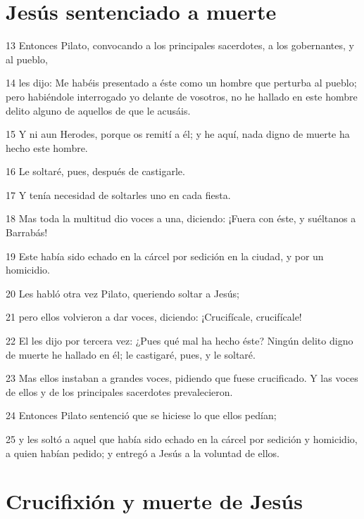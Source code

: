 \section*{Jesús sentenciado a muerte}

\par 13 Entonces Pilato, convocando a los principales sacerdotes, a los gobernantes, y al pueblo,
\par 14 les dijo: Me habéis presentado a éste como un hombre que perturba al pueblo; pero habiéndole interrogado yo delante de vosotros, no he hallado en este hombre delito alguno de aquellos de que le acusáis.
\par 15 Y ni aun Herodes, porque os remití a él; y he aquí, nada digno de muerte ha hecho este hombre.
\par 16 Le soltaré, pues, después de castigarle.
\par 17 Y tenía necesidad de soltarles uno en cada fiesta.
\par 18 Mas toda la multitud dio voces a una, diciendo: ¡Fuera con éste, y suéltanos a Barrabás!
\par 19 Este había sido echado en la cárcel por sedición en la ciudad, y por un homicidio.
\par 20 Les habló otra vez Pilato, queriendo soltar a Jesús;
\par 21 pero ellos volvieron a dar voces, diciendo: ¡Crucifícale, crucifícale!
\par 22 El les dijo por tercera vez: ¿Pues qué mal ha hecho éste? Ningún delito digno de muerte he hallado en él; le castigaré, pues, y le soltaré.
\par 23 Mas ellos instaban a grandes voces, pidiendo que fuese crucificado. Y las voces de ellos y de los principales sacerdotes prevalecieron.
\par 24 Entonces Pilato sentenció que se hiciese lo que ellos pedían;
\par 25 y les soltó a aquel que había sido echado en la cárcel por sedición y homicidio, a quien habían pedido; y entregó a Jesús a la voluntad de ellos.

\section*{Crucifixión y muerte de Jesús}

